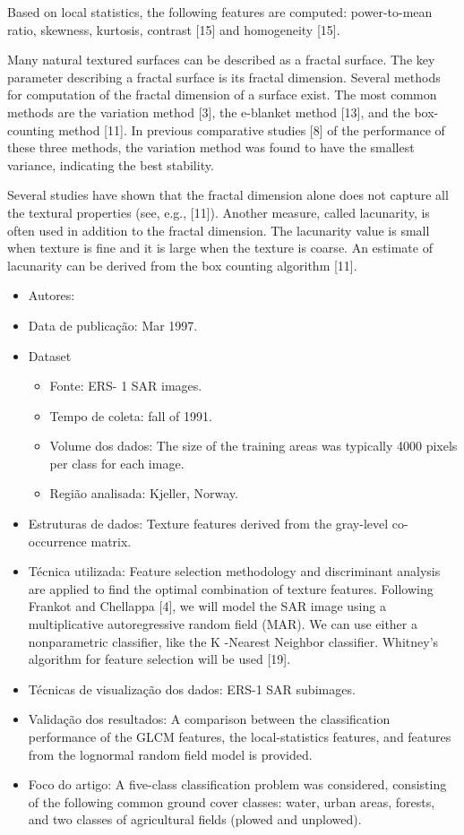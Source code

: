 \documentclass[paper=a4, fontsize=11pt]{scrartcl}
\begin{document}
Based on local statistics, the following features are computed: power-to-mean ratio, skewness, kurtosis, contrast [15] and homogeneity [15].

Many natural textured surfaces can be described as a fractal surface. 
The key parameter describing a fractal surface is its fractal dimension.
Several methods for computation of the fractal dimension of a surface exist.
The most common methods are the variation method [3], the e-blanket method [13], and the box-counting method [11]. 
In previous comparative studies [8] of the performance of these three methods, the variation method was found to have the smallest variance, indicating the best stability.

Several studies have shown that the fractal dimension alone does not capture all the textural properties (see, e.g., [11]). 
Another measure, called lacunarity, is often used in addition to the fractal dimension. 
The lacunarity value is small when texture is fine and it is large when the texture is coarse. 
An estimate of lacunarity can be derived from the box counting algorithm [11].

\begin{itemize}
    \item Autores:~\cite{solberg1997texture}
    \item Data de publicação: Mar 1997.
    \item Dataset
    \begin{itemize}
        \item Fonte: ERS- 1 SAR images.
        \item Tempo de coleta: fall of 1991.
        \item Volume dos dados: The size of the training areas was typically 4000 pixels per class for each image.
        \item Região analisada: Kjeller, Norway.
    \end{itemize}
    \item Estruturas de dados: Texture features derived from the gray-level co-occurrence matrix.
    \item Técnica utilizada: Feature selection methodology and discriminant analysis are applied to find the optimal combination of texture features. Following Frankot and Chellappa [4], we will model the SAR image using a multiplicative autoregressive random field (MAR). We can use either a nonparametric classifier, like the K -Nearest Neighbor classifier. Whitney’s algorithm for feature selection will be used [19].
    \item Técnicas de visualização dos dados: ERS-1 SAR subimages.
    \item Validação dos resultados: A comparison between the classification performance of the GLCM features, the local-statistics features, and features from the lognormal random field model is provided.
    \item Foco do artigo: A five-class classification problem was considered, consisting of the following common ground cover classes: water, urban areas, forests, and two classes of agricultural fields (plowed and unplowed).
\end{itemize}
\end{document}
